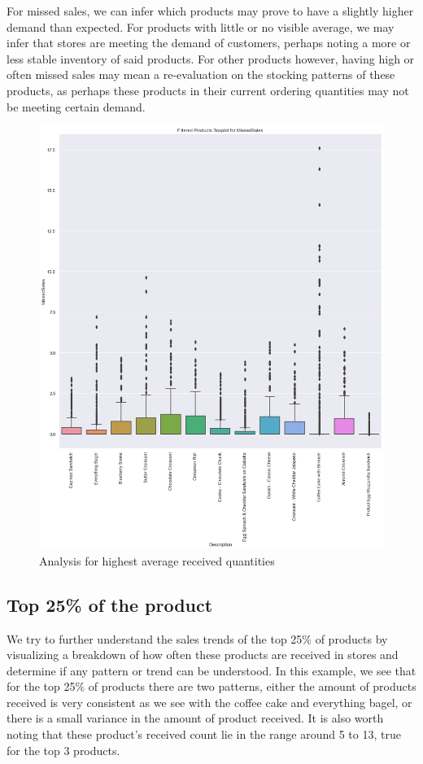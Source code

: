 For missed sales, we can infer which products may prove to have a slightly higher demand than expected. For products with little or no visible average, we may infer that stores are meeting the demand of customers, perhaps noting a more or less stable inventory of said products. For other products however, having high or often missed sales may mean a re-evaluation on the stocking patterns of these products, as perhaps these products in their current ordering quantities may not be meeting certain demand. 
\begin{figure}[ht]
    \centering
    \includegraphics[width = 0.7\linewidth]{figures/figure4.png}
    \caption{Analysis for highest average received quantities }
\end{figure}

\newpage

\subsection{Top 25\% of the product }
We try to further understand the sales trends of the top 25\% of products by visualizing a breakdown of how often these products are received in stores and determine if any pattern or trend can be understood. In this example, we see that for the top 25\% of products there are two patterns, either the amount of products received is very consistent as we see with the coffee cake and everything bagel, or there is a small variance in the amount of product received. It is also worth noting that these product’s received count lie in the range around 5 to 13, true for the top 3 products. 

